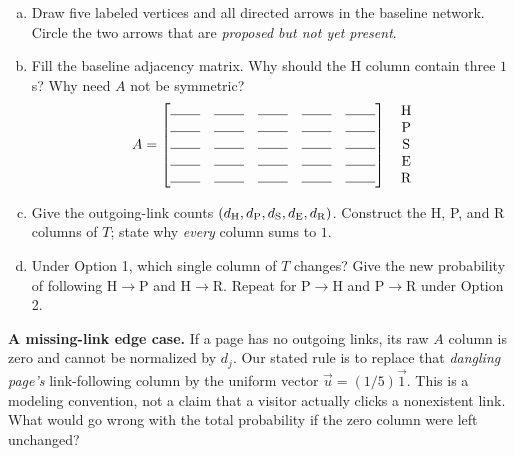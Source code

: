 \documentclass[10pt,letterpaper]{article}
\newcommand{\blank}{\rule{0.75cm}{0.4pt}}
\begin{document}
\begin{enumerate}[a.,leftmargin=*]
\item Draw five labeled vertices and all directed arrows in the baseline network. Circle the two arrows that are \emph{proposed but not yet present}.\\[0.90in]
\item Fill the baseline adjacency matrix. Why should the H column contain three $1$s? Why need $A$ not be symmetric?
\[
A=\begin{bmatrix}
\blank&\blank&\blank&\blank&\blank\\
\blank&\blank&\blank&\blank&\blank\\
\blank&\blank&\blank&\blank&\blank\\
\blank&\blank&\blank&\blank&\blank\\
\blank&\blank&\blank&\blank&\blank
\end{bmatrix}
\quad\begin{matrix} \mathrm H\\\mathrm P\\\mathrm S\\\mathrm E\\\mathrm R\end{matrix}
\]
\item Give the outgoing-link counts $(d_{\rm H},d_{\rm P},d_{\rm S},d_{\rm E},d_{\rm R})$. Construct the H, P, and R columns of $T$; state why \emph{every} column sums to $1$.\\[0.72in]
\item Under Option 1, which single column of $T$ changes? Give the new probability of following H$\to$P and H$\to$R. Repeat for P$\to$H and P$\to$R under Option 2.\\[0.58in]
\end{enumerate}

\textbf{A missing-link edge case.} If a page has no outgoing links, its raw $A$ column is zero and cannot be normalized by $d_j$. Our stated rule is to replace that \emph{dangling page's} link-following column by the uniform vector $\vec u=(1/5)\vec 1$. This is a modeling convention, not a claim that a visitor actually clicks a nonexistent link. What would go wrong with the total probability if the zero column were left unchanged?\\

\newpage
\end{document}
